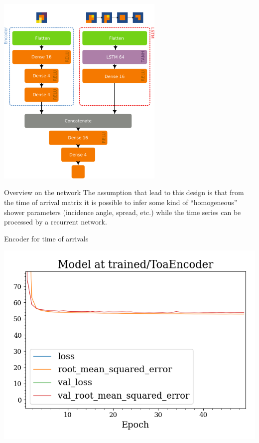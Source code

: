 \documentclass{beamer}
\begin{document}
    \centering
    \includegraphics[width=0.6\textwidth]{model.pdf}
\begin{frame}{Overview on the network}
    The assumption that lead to this design is that from the time of arrival matrix
    it is possible to infer some kind of ``homogeneous'' shower parameters (incidence angle, spread, etc.)
    while the time series can be processed by a recurrent network.
\end{frame}

\begin{frame}{Encoder for time of arrivals}

    \includegraphics[width=\textwidth]{ENC_history.png}
    
\end{frame}
\end{document}
